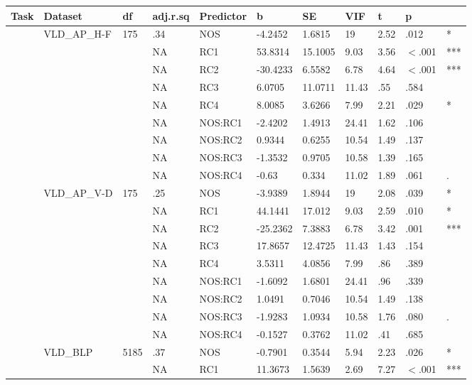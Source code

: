 \begin{table}[ht]
\centering
\begingroup\normalsize
\begin{tabular}{lllllllllll}
  \hline
Task & Dataset & df & adj.r.sq & Predictor & b & SE & VIF & t & p &  \\ 
  \hline
 & VLD\_AP\_H-F & 175 & .34 & NOS & -4.2452 & 1.6815 & 19 & 2.52 & .012 & * \\ 
   &  &  & NA & RC1 & 53.8314 & 15.1005 & 9.03 & 3.56 & $<$.001 & *** \\ 
   &  &  & NA & RC2 & -30.4233 & 6.5582 & 6.78 & 4.64 & $<$.001 & *** \\ 
   &  &  & NA & RC3 & 6.0705 & 11.0711 & 11.43 & .55 & .584 &   \\ 
   &  &  & NA & RC4 & 8.0085 & 3.6266 & 7.99 & 2.21 & .029 & * \\ 
   &  &  & NA & NOS:RC1 & -2.4202 & 1.4913 & 24.41 & 1.62 & .106 &   \\ 
   &  &  & NA & NOS:RC2 & 0.9344 & 0.6255 & 10.54 & 1.49 & .137 &   \\ 
   &  &  & NA & NOS:RC3 & -1.3532 & 0.9705 & 10.58 & 1.39 & .165 &   \\ 
   &  &  & NA & NOS:RC4 & -0.63 & 0.334 & 11.02 & 1.89 & .061 & . \\ 
   & VLD\_AP\_V-D & 175 & .25 & NOS & -3.9389 & 1.8944 & 19 & 2.08 & .039 & * \\ 
   &  &  & NA & RC1 & 44.1441 & 17.012 & 9.03 & 2.59 & .010 & * \\ 
   &  &  & NA & RC2 & -25.2362 & 7.3883 & 6.78 & 3.42 & .001 & *** \\ 
   &  &  & NA & RC3 & 17.8657 & 12.4725 & 11.43 & 1.43 & .154 &   \\ 
   &  &  & NA & RC4 & 3.5311 & 4.0856 & 7.99 & .86 & .389 &   \\ 
   &  &  & NA & NOS:RC1 & -1.6092 & 1.6801 & 24.41 & .96 & .339 &   \\ 
   &  &  & NA & NOS:RC2 & 1.0491 & 0.7046 & 10.54 & 1.49 & .138 &   \\ 
   &  &  & NA & NOS:RC3 & -1.9283 & 1.0934 & 10.58 & 1.76 & .080 & . \\ 
   &  &  & NA & NOS:RC4 & -0.1527 & 0.3762 & 11.02 & .41 & .685 &   \\ 
   & VLD\_BLP & 5185 & .37 & NOS & -0.7901 & 0.3544 & 5.94 & 2.23 & .026 & * \\ 
   &  &  & NA & RC1 & 11.3673 & 1.5639 & 2.69 & 7.27 & $<$.001 & *** \\ 

\end{tabular}
\end{table}
